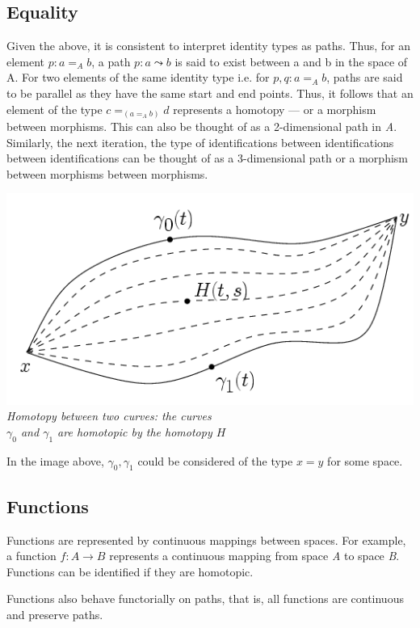 \documentclass[12pt]{report}
\begin{document}
\subsection*{Equality}
Given the above, it is consistent to interpret identity types as paths. Thus, for an element $p : a =_A b$, a path $ p : a \leadsto b $ is said to exist between a and b in the space of A. For two elements of the same identity type i.e. for $p,q : a =_A b$, paths are said to be parallel as they have the same start and end points. Thus, it follows that an element of the type $c =_{(a =_A b)} d$ represents a homotopy --- or a morphism between morphisms. This can also be thought of as a 2-dimensional path in \textit{A}. Similarly, the next iteration, the type of identifications between identifications between identifications can be thought of as a 3-dimensional path or a morphism between morphisms between morphisms.
\begin{center}
\includegraphics[scale=0.5]{./2.png}\\
\small{\textit{Homotopy between two curves: the curves\\ $\gamma_0$ and $ \gamma_1$ are homotopic by the homotopy $H$}}
\end{center}
In the image above, $\gamma_0, \gamma_1$ could be considered of the type $x = y$ for some space.

\subsection*{Functions}
Functions are represented by continuous mappings between spaces. For example, a function $f : A \rightarrow B$ represents a continuous mapping from space \textit{A} to space \textit{B}. Functions can be identified if they are homotopic.

Functions also behave functorially on paths, that is, all functions are continuous and preserve paths.
\end{document}

